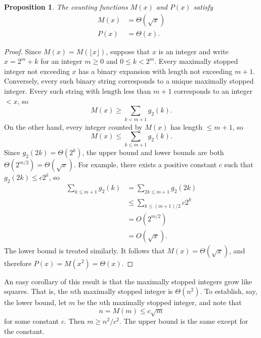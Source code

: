\documentclass[12pt]{article}
\newtheorem{proposition}{Proposition}
\theoremstyle{definition}
\begin{document}
\begin{proposition}
    The counting functions $M(x)$ and $P(x)$ satisfy
    \begin{align*}
        M(x) &= \Theta(\sqrt{x}) \\
        P(x) &= \Theta(x).
    \end{align*}
\end{proposition}

\begin{proof}
    Since $M(x) = M(\lfloor x \rfloor)$, suppose that $x$ is an integer and
    write $x = 2^m + k$ for an integer $m \geq 0$ and $0 \leq k < 2^m$. Every
    maximally stopped integer not exceeding $x$ has a binary expansion with
    length not exceeding $m + 1$. Conversely, every such binary string
    corresponds to a unique maximally stopped integer. Every such string with
    length less than $m + 1$ corresponds to an integer $< x$, so
    \begin{equation*}
        M(x) \geq \sum_{k < m + 1} g_2(k).
    \end{equation*}
    On the other hand, every integer counted by $M(x)$ has length $\leq m + 1$,
    so
    \begin{equation*}
        M(x) \leq \sum_{k \leq m + 1} g_2(k).
    \end{equation*}
    Since $g_2(2k) = \Theta(2^k)$, the upper bound and lower bounds are both
    $\Theta(2^{m / 2}) = \Theta(\sqrt{x})$. For example, there exists a
    positive constant $c$ such that $g_2(2k) \leq c 2^k$, so
    \begin{align*}
        \sum_{k \leq m + 1} g_2(k) &= \sum_{2k \leq m + 1} g_2(2k) \\
                                   &\leq \sum_{k \leq (m + 1) / 2} c 2^k \\
                                   &= O(2^{m / 2}) \\
                                   &= O(\sqrt{x}).
    \end{align*}
    The lower bound is treated similarly. It follows that $M(x) =
    \Theta(\sqrt{x})$, and therefore $P(x) = M(x^2) = \Theta(x)$.
\end{proof}

An easy corollary of this result is that the maximally stopped integers grow
like squares. That is, the $n$th maximally stopped integer is $\Theta(n^2)$. To
establish, say, the lower bound, let $m$ be the $n$th maximally stopped
integer, and note that
\begin{equation*}
    n = M(m) \leq c \sqrt{m}
\end{equation*}
for some constant $c$. Then $m \geq n^2 / c^2$. The upper bound is the same
except for the constant.
\end{document}
